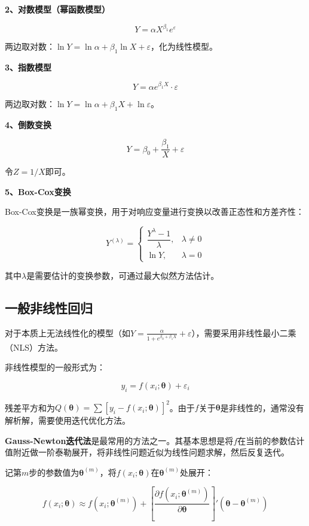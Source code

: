 \documentclass[
]{book}
\begin{document}
\textbf{2、对数模型（幂函数模型）}

\[
Y = \alpha X^{\beta_1} e^{\varepsilon}
\]

两边取对数：\(\ln Y = \ln \alpha + \beta_1 \ln X + \varepsilon\)，化为线性模型。

\textbf{3、指数模型}

\[
Y = \alpha e^{\beta_1 X} \cdot \varepsilon
\]

两边取对数：\(\ln Y = \ln \alpha + \beta_1 X + \ln \varepsilon\)。

\textbf{4、倒数变换}

\[
Y = \beta_0 + \frac{\beta_1}{X} + \varepsilon
\]

令\(Z = 1/X\)即可。

\textbf{5、Box-Cox变换}

Box-Cox变换是一族幂变换，用于对响应变量进行变换以改善正态性和方差齐性：

\[
Y^{(\lambda)} = \begin{cases}
\dfrac{Y^\lambda - 1}{\lambda}, & \lambda \neq 0 \\
\ln Y, & \lambda = 0
\end{cases}
\]

其中\(\lambda\)是需要估计的变换参数，可通过最大似然方法估计。

\subsection{一般非线性回归}\label{ux4e00ux822cux975eux7ebfux6027ux56deux5f52}

对于本质上无法线性化的模型（如\(Y = \frac{\alpha}{1 + e^{\beta_0 + \beta_1 X}} + \varepsilon\)），需要采用非线性最小二乘（NLS）方法。

非线性模型的一般形式为：

\[
y_i = f(x_i; \boldsymbol{\theta}) + \varepsilon_i
\]

残差平方和为\(Q(\boldsymbol{\theta}) = \sum [y_i - f(x_i; \boldsymbol{\theta})]^2\)。由于\(f\)关于\(\boldsymbol{\theta}\)是非线性的，通常没有解析解，需要使用迭代优化方法。

\textbf{Gauss-Newton迭代法}是最常用的方法之一。其基本思想是将\(f\)在当前的参数估计值附近做一阶泰勒展开，将非线性问题近似为线性问题求解，然后反复迭代。

记第\(m\)步的参数值为\(\boldsymbol{\theta}^{(m)}\)，将\(f(x_i; \boldsymbol{\theta})\)在\(\boldsymbol{\theta}^{(m)}\)处展开：

\[
f(x_i; \boldsymbol{\theta}) \approx f(x_i; \boldsymbol{\theta}^{(m)}) + \left[ \frac{\partial f(x_i; \boldsymbol{\theta}^{(m)})}{\partial \boldsymbol{\theta}} \right]' (\boldsymbol{\theta} - \boldsymbol{\theta}^{(m)})
\]
\end{document}
